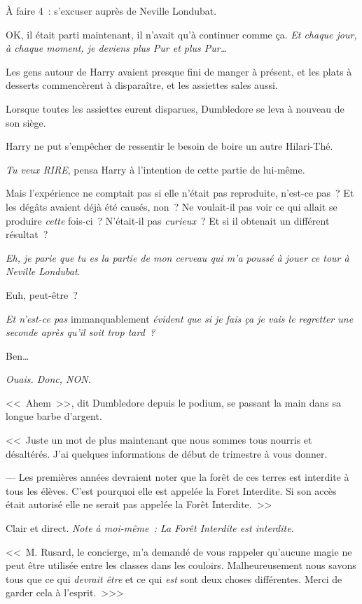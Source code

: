 À faire 4~: s'excuser auprès de Neville Londubat.

OK, il était parti maintenant, il n'avait qu'à continuer comme ça. \emph{Et chaque jour, à chaque moment, je deviens plus Pur et plus Pur…}

Les gens autour de Harry avaient presque fini de manger à présent, et les plats à desserts commencèrent à disparaître, et les assiettes sales aussi.

Lorsque toutes les assiettes eurent disparues, Dumbledore se leva à nouveau de son siège.

Harry ne put s'empêcher de ressentir le besoin de boire un autre Hilari-Thé.

\emph{Tu veux RIRE}, pensa Harry à l'intention de cette partie de lui-même.

Mais l'expérience ne comptait pas si elle n'était pas reproduite, n'est-ce pas~? Et les dégâts avaient déjà été causés, non~? Ne voulait-il pas voir ce qui allait se produire \emph{cette} fois-ci~? N'était-il pas \emph{curieux}~? Et si il obtenait un différent résultat~?

\emph{Eh, je parie que tu es la partie de mon cerveau qui m'a poussé à jouer ce tour à Neville Londubat}.

Euh, peut-être~?

\emph{Et n'est-ce pas} immanquablement \emph{évident que si je fais ça je vais le regretter une seconde après qu'il soit trop tard~?}

Ben…

\emph{Ouais. Donc, NON.}

<<~Ahem~>>, dit Dumbledore depuis le podium, se passant la main dans sa longue barbe d'argent.

<<~Juste un mot de plus maintenant que nous sommes tous nourris et désaltérés. J'ai quelques informations de début de trimestre à vous donner.

--- Les premières années devraient noter que la forêt de ces terres est interdite à tous les élèves. C'est pourquoi elle est appelée la Foret Interdite. Si son accès était autorisé elle ne serait pas appelée la Forêt Interdite.~>>

Clair et direct. \emph{Note à moi-même~: La Forêt Interdite est interdite.}

<<~M. Rusard, le concierge, m'a demandé de vous rappeler qu'aucune magie ne peut être utilisée entre les classes dans les couloirs. Malheureusement nous savons tous que ce qui \emph{devrait être} et ce qui \emph{est} sont deux choses différentes. Merci de garder cela à l'esprit.~>>>


